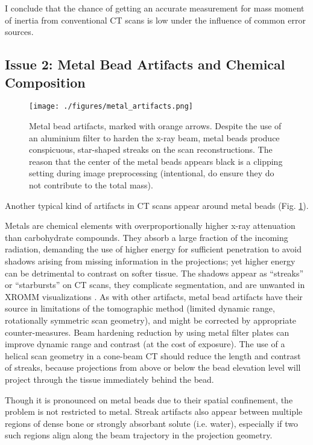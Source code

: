 I conclude that the chance of getting an accurate measurement for mass moment of inertia from conventional CT scans is low under the influence of common error sources.



\subsection{Issue 2: Metal Bead Artifacts and Chemical Composition}
\label{sec:orge4f5f0f}

\begin{figure}[p]
\centering
\texttt{[image: ./figures/metal\_artifacts.png]}
\caption{\label{fig:metal_artifacts}Metal bead artifacts, marked with orange arrows. Despite the use of an aluminium filter to harden the x-ray beam, metal beads produce conspicuous, star-shaped streaks on the scan reconstructions. The reason that the center of the metal beads appears black is a clipping setting during image preprocessing (intentional, do ensure they do not contribute to the total mass).}
\end{figure}

Another typical kind of artifacts in CT scans appear around metal beads (Fig. \ref{fig:metal_artifacts}).

Metals are chemical elements with overproportionally higher x-ray attenuation than carbohydrate compounds.
They absorb a large fraction of the incoming radiation, demanding the use of higher energy for sufficient penetration to avoid shadows arising from missing information in the projections; yet higher energy can be detrimental to contrast on softer tissue.
The shadows appear as ``streaks'' or ``starbursts'' on CT scans, they complicate segmentation, and are unwanted in XROMM visualizations \citep{Brainerd2010}.
As with other artifacts, metal bead artifacts have their source in limitations of the tomographic method (limited dynamic range, rotationally symmetric scan geometry), and might be corrected by appropriate counter-measures.
Beam hardening reduction by using metal filter plates can improve dynamic range and contrast (at the cost of exposure).
The use of a helical scan geometry in a cone-beam CT should reduce the length and contrast of streaks, because projections from above or below the bead elevation level will project through the tissue immediately behind the bead.

Though it is pronounced on metal beads due to their spatial confinement, the problem is not restricted to metal.
Streak artifacts also appear between multiple regions of dense bone or strongly absorbant solute (i.e. water), especially if two such regions align along the beam trajectory in the projection geometry.


